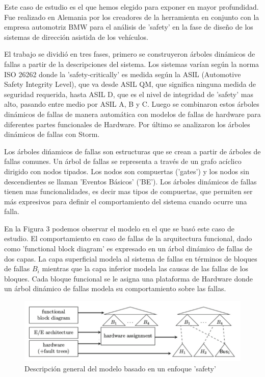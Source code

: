 \documentclass[11pt]{article}
\begin{document}
Este caso de estudio es el que hemos elegido para exponer en mayor profundidad. Fue realizado en Alemania por los creadores de la herramienta en conjunto con la empresa automotriz BMW para el an\'alisis de 'safety' en la fase de dise\~no de los sistemas de direcci\'on asistida de los veh\'iculos.

El trabajo se dividi\'o en tres fases, primero se construyeron \'arboles din\'amicos de fallas a partir de la descripciones del sistema. Los sistemas var\'ian seg\'un la norma ISO 26262 donde la 'safety-critically' es medida seg\'un la ASIL (Automotive Safety Integrity Level), que va desde ASIL QM, que significa ninguna medida de seguridad requerida, hasta ASIL D, que es el nivel de integridad de 'safety' mas alto, pasando entre medio por ASIL A, B y C. Luego se combinaron estos \'arboles din\'amicos de fallas de manera autom\'atica con modelos de fallas de hardware para diferentes partes funcionales de Hardware. Por \'ultimo se analizaron los \'arboles din\'amicos de fallas con Storm.

Los \'arboles di\'namicos de fallas son estructuras que se crean a partir de \'arboles de fallas comunes. Un \'arbol de fallas se representa a trav\'es de un grafo ac\'iclico dirigido con nodos tipados. Los nodos son compuertas ('gates') y los nodos sin descendientes se llaman 'Eventos B\'asicos' ('BE'). Los \'arboles din\'amicos de fallas tienen mas funcionalidades, es decir mas tipos de compuertas, que permiten ser m\'as expresivos para definir el comportamiento del sistema cuando ocurre una falla.

En la Figura 3 podemos observar el modelo en el que se bas\'o este caso de estudio. El comportamiento en caso de fallas de la arquitectura funcional, dado como 'functional block diagram' es expresado en un \'arbol din\'amico de fallas de dos capas. La capa superficial modela al sistema de fallas en t\'erminos de bloques de fallas $B_i$ mientras que la capa inferior modela las causas de las fallas de los bloques. Cada bloque funcional se le asigna una plataforma de Hardware donde un \'arbol din\'amico de fallas modela su comportamiento sobre las fallas.

\begin{figure}[h]
	\includegraphics[scale=0.43]{modelbased.png} 
	\centering
	\caption{Descripci\'on general del modelo basado en un enfoque 'safety'}%
\end{figure}
\end{document}
